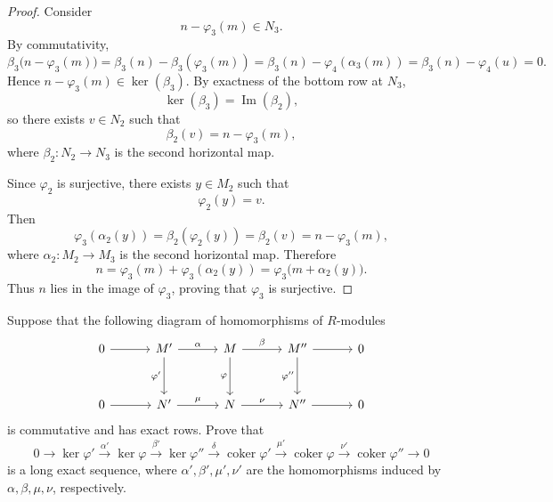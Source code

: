 \begin{proof}
    Consider
    \[
        n-\varphi_3(m)\in N_3.
    \]
    By commutativity,
    \[
        \beta_3\bigl(n-\varphi_3(m)\bigr)
        =
        \beta_3(n)-\beta_3(\varphi_3(m))
        =
        \beta_3(n)-\varphi_4(\alpha_3(m))
        =
        \beta_3(n)-\varphi_4(u)
        =
        0.
    \]
    Hence $n-\varphi_3(m)\in\ker(\beta_3)$. By exactness of the bottom row at $N_3$,
    \[
        \ker(\beta_3)=\operatorname{Im}(\beta_2),
    \]
    so there exists $v\in N_2$ such that
    \[
        \beta_2(v)=n-\varphi_3(m),
    \]
    where $\beta_2:N_2\to N_3$ is the second horizontal map.

    Since $\varphi_2$ is surjective, there exists $y\in M_2$ such that
    \[
        \varphi_2(y)=v.
    \]
    Then
    \[
        \varphi_3(\alpha_2(y))
        =
        \beta_2(\varphi_2(y))
        =
        \beta_2(v)
        =
        n-\varphi_3(m),
    \]
    where $\alpha_2:M_2\to M_3$ is the second horizontal map. Therefore
    \[
        n
        =
        \varphi_3(m)+\varphi_3(\alpha_2(y))
        =
        \varphi_3\bigl(m+\alpha_2(y)\bigr).
    \]
    Thus $n$ lies in the image of $\varphi_3$, proving that $\varphi_3$ is surjective.
\end{proof}

\begin{exercise}
    Suppose that the following diagram of homomorphisms of $R$-modules
    \[
        \begin{tikzcd}[column sep=3.2em, row sep=3em]
            0 \arrow[r] &
            M' \arrow[r, "\alpha"] \arrow[d, "\varphi'"'] &
            M \arrow[r, "\beta"] \arrow[d, "\varphi"'] &
            M'' \arrow[r] \arrow[d, "\varphi''"'] &
            0 \\
            0 \arrow[r] &
            N' \arrow[r, "\mu"] &
            N \arrow[r, "\nu"] &
            N'' \arrow[r] &
            0
        \end{tikzcd}
    \]
    is commutative and has exact rows. Prove that
    \[
        0 \longrightarrow \ker\varphi'
        \overset{\alpha'}{\longrightarrow} \ker\varphi
        \overset{\beta'}{\longrightarrow} \ker\varphi''
        \overset{\delta}{\longrightarrow} \operatorname{coker}\varphi'
        \overset{\mu'}{\longrightarrow} \operatorname{coker}\varphi
        \overset{\nu'}{\longrightarrow} \operatorname{coker}\varphi''
        \longrightarrow 0
    \]
    is a long exact sequence, where $\alpha',\beta',\mu',\nu'$ are the homomorphisms induced by $\alpha,\beta,\mu,\nu$, respectively.
\end{exercise}

